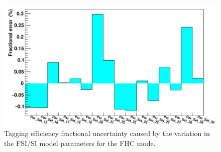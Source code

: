 \begin{figure}
    \includegraphics[scale=0.4]{Figures/fsisi_uncertainty.png}
\caption{Tagging efficiency fractional uncertainty caused by the variation in the FSI/SI model parameters for the FHC mode.}
\label{fig:fsisiuncertainty}
\end{figure}

